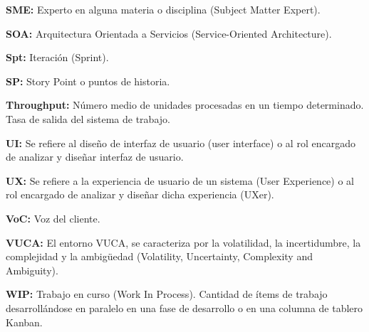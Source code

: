 \begin{description}
  \item {\textbf{SME:} Experto en alguna materia o disciplina (Subject Matter Expert).}
   
  \item {\textbf{SOA:} Arquitectura Orientada a Servicios (Service-Oriented Architecture).}
  
  \item {\textbf{Spt:} Iteración (Sprint).}
  
  \item {\textbf{SP:} Story Point o puntos de historia.}
  
 \item {\textbf{Throughput:} Número medio de unidades procesadas en un tiempo determinado. Tasa de salida del sistema de trabajo.}
  
  \item {\textbf{UI:} Se refiere al diseño de interfaz de usuario (user interface) o al rol encargado de analizar y diseñar interfaz de usuario.}
  
    \item {\textbf{UX:} Se refiere a la experiencia de usuario de un sistema (User Experience) o al rol encargado de analizar y diseñar dicha experiencia (UXer).}
    
  \item {\textbf{VoC:} Voz del cliente.}
  
  \item {\textbf{VUCA:} El entorno VUCA, se caracteriza por la volatilidad, la incertidumbre, la complejidad y la ambigüedad (Volatility, Uncertainty, Complexity and Ambiguity).}
  
  \item {\textbf{WIP:} Trabajo en curso (Work In Process). Cantidad de ítems de trabajo desarrollándose en paralelo en una fase de desarrollo o en una columna de tablero Kanban.}
  
    
\end{description}
  

